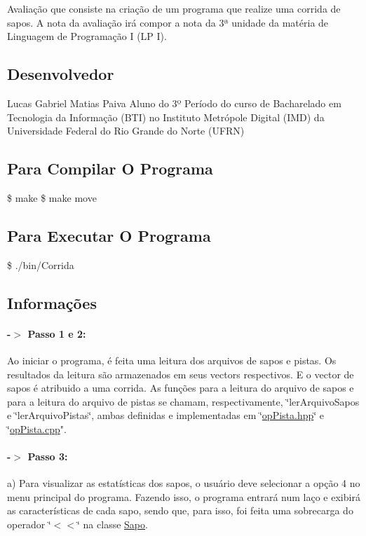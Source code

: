 Avaliação que consiste na criação de um programa que realize uma corrida de sapos. A nota da avaliação irá compor a nota da 3ª unidade da matéria de Linguagem de Programação I (LP I).

\subsection*{Desenvolvedor}

Lucas Gabriel Matias Paiva Aluno do 3º Período do curso de Bacharelado em Tecnologia da Informação (B\+TI) no Instituto Metrópole Digital (I\+MD) da Universidade Federal do Rio Grande do Norte (U\+F\+RN)

\subsection*{Para Compilar O Programa}

\$ make  \$ make move

\subsection*{Para Executar O Programa}

\$ ./bin/\+Corrida

\subsection*{Informações}

\paragraph*{-\/$>$ Passo 1 e 2\+:}

Ao iniciar o programa, é feita uma leitura dos arquivos de sapos e pistas. Os resultados da leitura são armazenados em seus vector\textquotesingle{}s respectivos. E o vector de sapos é atribuido a uma corrida. As funções para a leitura do arquivo de sapos e para a leitura do arquivo de pistas se chamam, respectivamente, \char`\"{}ler\+Arquivo\+Sapos e \char`\"{}ler\+Arquivo\+Pistas\char`\"{}, ambas definidas e implementadas em \char`\"{}\hyperlink{opPista_8hpp}{op\+Pista.\+hpp}\char`\"{} e \char`\"{}\hyperlink{opPista_8cpp}{op\+Pista.\+cpp}". 

\paragraph*{-\/$>$ Passo 3\+:}

a) Para visualizar as estatísticas dos sapos, o usuário deve selecionar a opção 4 no menu principal do programa. Fazendo isso, o programa entrará num laço e exibirá as características de cada sapo, sendo que, para isso, foi feita uma sobrecarga do operador \char`\"{}$<$$<$\char`\"{} na classe \hyperlink{classSapo}{Sapo}. 

